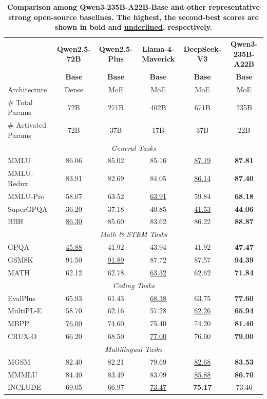 \documentclass[dvipsnames]{article}
\begin{document}
\begin{table}[tbp]
\centering
\caption{\textbf{Comparison among Qwen3-235B-A22B-Base and other representative strong open-source baselines. The highest,
the second-best scores are shown in \textbf{bold} and \underline{underlined}, respectively.}}
\label{tab:base-235A22B}
\small 
\setlength{\tabcolsep}{3pt} 
\begin{tabular}{@{}lccccc@{}}
\toprule
& \textbf{Qwen2.5-72B} & \textbf{Qwen2.5-Plus} & \textbf{Llama-4-Maverick} & \textbf{DeepSeek-V3} & \textbf{Qwen3-235B-A22B} \\
& \textbf{Base} & \textbf{Base} & \textbf{Base} & \textbf{Base} & \textbf{Base} \\
\midrule
Architecture & Dense & MoE & MoE & MoE & MoE\\
\# Total Params & 72B & 271B & 402B & 671B & 235B\\
\# Activated Params & 72B & 37B & 17B & 37B & 22B\\
\midrule
\multicolumn{6}{c}{\textit{General Tasks}} \\
\midrule
MMLU & 86.06 & 85.02 & 85.16 & \underline{87.19} & \textbf{87.81}\\
MMLU-Redux & 83.91 & 82.69 & 84.05 & \underline{86.14} & \textbf{87.40} \\
MMLU-Pro & 58.07 & 63.52 & \underline{63.91} & 59.84 & \textbf{68.18} \\
SuperGPQA & 36.20 & 37.18 & 40.85 & \underline{41.53} & \textbf{44.06} \\
BBH & \underline{86.30} & 85.60 & 83.62 & 86.22 & \textbf{88.87} \\
\midrule
\multicolumn{6}{c}{\textit{Math \& STEM Tasks}} \\
\midrule
GPQA & \underline{45.88} & 41.92 & 43.94 & 41.92 & \textbf{47.47} \\
GSM8K & 91.50 & \underline{91.89} & 87.72 & 87.57 & \textbf{94.39} \\
MATH & 62.12 & 62.78 & \underline{63.32} & 62.62 & \textbf{71.84} \\
\midrule
\multicolumn{6}{c}{\textit{Coding Tasks}} \\
\midrule
EvalPlus & 65.93 & 61.43 & \underline{68.38} & 63.75 & \textbf{77.60} \\
MultiPL-E & 58.70 & 62.16 & 57.28 & \underline{62.26} & \textbf{65.94} \\
MBPP & \underline{76.00} & 74.60 & 75.40 & 74.20 & \textbf{81.40} \\
CRUX-O & 66.20 & 68.50 & \underline{77.00} & 76.60 & \textbf{79.00} \\
\midrule
\multicolumn{6}{c}{\textit{Multilingual Tasks}} \\
\midrule
MGSM & 82.40 & 82.21 & 79.69 & \underline{82.68} & \textbf{83.53} \\
MMMLU & 84.40 & 83.49 & 83.09 & \underline{85.88} & \textbf{86.70} \\
INCLUDE & 69.05 & 66.97 & \underline{73.47} & \textbf{75.17} & 73.46 \\
\bottomrule
\end{tabular}
\end{table}
\end{document}
